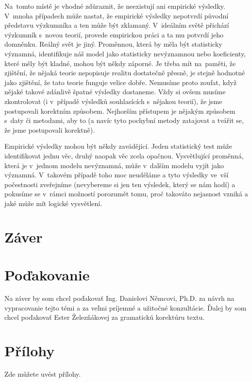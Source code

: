 \documentclass[12pt,a4paper,oneside,final]{article}
\theoremstyle{definition}
\theoremstyle{remark}
\numberwithin{equation}{section}
\begin{document}
Na~tomto místě je vhodné zdůraznit, že neexistují  ani  empirické výsledky. V~mnoha případech může nastat, že empirické výsledky nepotvrdí původní představu výzkumníka a ten může být zklamaný. V~ideálním světě přichází výzkumník s~novou teorií, provede empirickou práci a ta mu potvrdí jeho domněnku. Reálný svět je jiný. Proměnnou, která by měla být statisticky významná, identifikuje náš model jako statisticky nevýznamnou nebo koeficienty, které měly být kladné, mohou být někdy záporné. Je třeba mít na~paměti, že zjištění, že nějaká teorie nepopisuje realitu dostatečně přesně, je stejně hodnotné jako zjištění, že tato teorie funguje velice dobře. Nemusíme proto zoufat, když nějaké takové zdánlivě špatné výsledky dostaneme. Vždy si ovšem musíme zkontrolovat (i v~případě výsledků souhlasících s~nějakou teorií), že jsme postupovali korektním způsobem. Nejhorším přístupem je nějakým způsobem  s~daty či metodami, aby to  (a navíc tyto pochybní metody zatajovat a tvářit se, že jsme postupovali korektně).   

Empirické výsledky mohou být někdy zavádějící. Jeden statistický test může identifikovat jednu věc, druhý naopak věc zcela opačnou. Vysvětlující proměnná, která je v~jednom modelu nevýznamná, může v~dalším modelu vyjít jako významná. V~takovém případě toho moc neuděláme a tyto výsledky ve~vší počestnosti zveřejníme (nevybereme si jen ten výsledek, který se nám hodí) a pokusíme se v~rámci možností porozumět tomu, proč takováto nejasnost vzniká a jaké může mít logické vysvětlení. 

\section{Záver}


\section*{Poďakovanie}

Na záver by som chcel poďakovať Ing. Danielovi Němcovi, Ph.D. za návrh na vypracovanie
tejto témi a za veľmi príjemné a užitočné konzultácie. Ďalej by som chcel poďakovať Ester
Železňákovej za gramatickú korektúru textu.




\newpage
\renewcommand{\thesection}{\Alph{section}}
\setcounter{section}{0}
\renewcommand{\thepage}{\roman{page}}
\setcounter{page}{1}
\section{Přílohy}
\label{priloha}

Zde můžete uvést přílohy.
\end{document}
